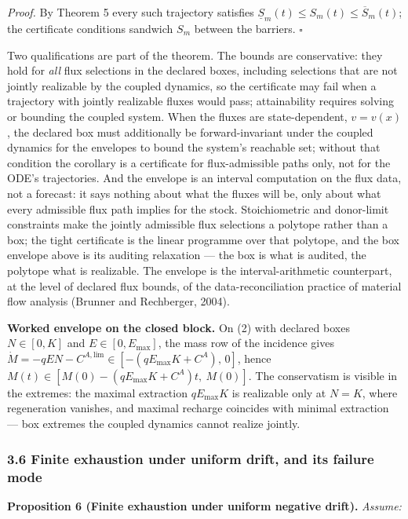 \documentclass[11pt]{article}
\begin{document}
\emph{Proof.} By Theorem 5 every such trajectory satisfies
\(\underline{S}_m(t) \le S_m(t) \le \overline{S}_m(t)\); the certificate
conditions sandwich \(S_m\) between the barriers. \ensuremath{\square}

Two qualifications are part of the theorem. The bounds are conservative:
they hold for \emph{all} flux selections in the declared boxes,
including selections that are not jointly realizable by the coupled
dynamics, so the certificate may fail when a trajectory with jointly
realizable fluxes would pass; attainability requires solving or bounding
the coupled system. When the fluxes are state-dependent, \(v = v(x)\),
the declared box must additionally be forward-invariant under the
coupled dynamics for the envelopes to bound the system's reachable set;
without that condition the corollary is a certificate for
flux-admissible paths only, not for the ODE's trajectories. And the
envelope is an interval computation on the flux data, not a forecast: it
says nothing about what the fluxes will be, only about what every
admissible flux path implies for the stock. Stoichiometric and
donor-limit constraints make the jointly admissible flux selections a
polytope rather than a box; the tight certificate is the linear
programme over that polytope, and the box envelope above is its auditing
relaxation --- the box is what is audited, the polytope what is
realizable. The envelope is the interval-arithmetic counterpart, at the
level of declared flux bounds, of the data-reconciliation practice of
material flow analysis (Brunner and Rechberger, 2004).

\textbf{Worked envelope on the closed block.} On (2) with declared boxes
\(N \in [0, K]\) and \(E \in [0, E_{\max}]\), the mass row of the
incidence gives
\(\dot M = -qEN - C^{A,\mathrm{lim}} \in [-(qE_{\max}K + C^A),\, 0]\),
hence \(M(t) \in [M(0) - (qE_{\max}K + C^A)t,\ M(0)]\). The conservatism
is visible in the extremes: the maximal extraction \(qE_{\max}K\) is
realizable only at \(N = K\), where regeneration vanishes, and maximal
recharge coincides with minimal extraction --- box extremes the coupled
dynamics cannot realize jointly.

\subsubsection{3.6 Finite exhaustion under uniform drift, and its
failure
mode}\label{finite-exhaustion-under-uniform-drift-and-its-failure-mode}

\textbf{Proposition 6 (Finite exhaustion under uniform negative drift).}
\emph{Assume:}
\end{document}
